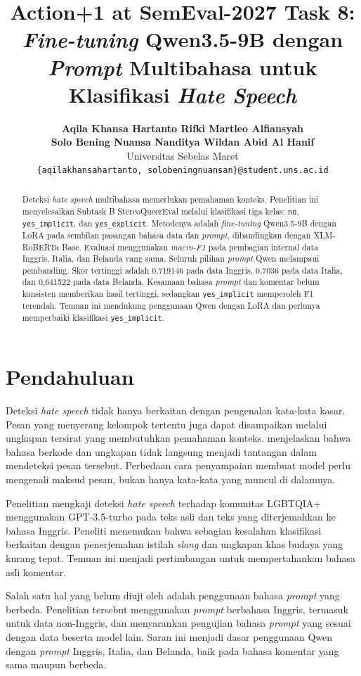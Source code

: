 \documentclass[11pt]{article}
\title{Action+1 at SemEval-2027 Task 8: \textit{Fine-tuning} Qwen3.5-9B dengan \textit{Prompt} Multibahasa untuk Klasifikasi \textit{Hate Speech}}
\author{\textbf{Aqila Khansa Hartanto \quad Rifki Martleo Alfiansyah} \\
\textbf{Solo Bening Nuansa Nanditya \quad Wildan Abid Al Hanif} \\
Universitas Sebelas Maret \\
\texttt{\{aqilakhansahartanto, solobeningnuansan\}@student.uns.ac.id}}
\renewcommand{\abstractname}{Abstrak}
\begin{document}
\renewcommand{\abstractname}{Abstrak}
\pagestyle{plain}
\raggedbottom
\maketitle
\begin{abstract}
Deteksi \textit{hate speech} multibahasa memerlukan pemahaman konteks. Penelitian ini menyelesaikan Subtask B StereoQueerEval melalui klasifikasi tiga kelas: \texttt{no}, \texttt{yes\_implicit}, dan \texttt{yes\_explicit}. Metodenya adalah \textit{fine-tuning} Qwen3.5-9B dengan LoRA pada sembilan pasangan bahasa data dan \textit{prompt}, dibandingkan dengan XLM-RoBERTa Base. Evaluasi menggunakan \textit{macro-F1} pada pembagian internal data Inggris, Italia, dan Belanda yang sama. Seluruh pilihan \textit{prompt} Qwen melampaui pembanding. Skor tertinggi adalah 0,719146 pada data Inggris, 0,7036 pada data Italia, dan 0,641522 pada data Belanda. Kesamaan bahasa \textit{prompt} dan komentar belum konsisten memberikan hasil tertinggi, sedangkan \texttt{yes\_implicit} memperoleh F1 terendah. Temuan ini mendukung penggunaan Qwen dengan LoRA dan perlunya memperbaiki klasifikasi \texttt{yes\_implicit}.
\end{abstract}

\section{Pendahuluan}
\label{sec:pendahuluan}

Deteksi \textit{hate speech} tidak hanya berkaitan dengan pengenalan kata-kata kasar. Pesan yang menyerang kelompok tertentu juga dapat disampaikan melalui ungkapan tersirat yang membutuhkan pemahaman konteks. \citet{elsherief-etal-2021-latent} menjelaskan bahwa bahasa berkode dan ungkapan tidak langsung menjadi tantangan dalam mendeteksi pesan tersebut. Perbedaan cara penyampaian membuat model perlu mengenali maksud pesan, bukan hanya kata-kata yang muncul di dalamnya.

Penelitian \citet{chan-etal-2024-hate} mengkaji deteksi \textit{hate speech} terhadap komunitas LGBTQIA+ menggunakan GPT-3.5-turbo pada teks asli dan teks yang diterjemahkan ke bahasa Inggris. Peneliti menemukan bahwa sebagian kesalahan klasifikasi berkaitan dengan penerjemahan istilah \textit{slang} dan ungkapan khas budaya yang kurang tepat. Temuan ini menjadi pertimbangan untuk mempertahankan bahasa asli komentar.

Salah satu hal yang belum diuji oleh \citet{chan-etal-2024-hate} adalah penggunaan bahasa \textit{prompt} yang berbeda. Penelitian tersebut menggunakan \textit{prompt} berbahasa Inggris, termasuk untuk data non-Inggris, dan menyarankan pengujian bahasa \textit{prompt} yang sesuai dengan data beserta model lain. Saran ini menjadi dasar penggunaan Qwen dengan \textit{prompt} Inggris, Italia, dan Belanda, baik pada bahasa komentar yang sama maupun berbeda.
\end{document}
